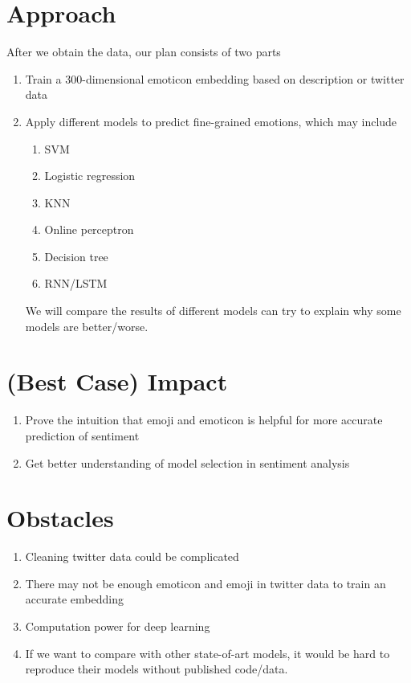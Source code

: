 \documentclass{proc}
\begin{document}
\section{Approach}
After we obtain the data, our plan consists of two parts
\begin{enumerate}
\item Train a 300-dimensional emoticon embedding based on description or twitter data
\item Apply different models to predict fine-grained emotions, which may include
\begin{enumerate}
  \item SVM
  \item Logistic regression
  \item KNN
  \item Online perceptron
  \item Decision tree
  \item RNN/LSTM 
  \end{enumerate}
  We will compare the results of different models can try to explain why some models are better/worse.
\end{enumerate}


\section{(Best Case) Impact}

\begin{enumerate}
\item Prove the intuition that emoji and emoticon is helpful for more accurate prediction of sentiment
 \item Get better understanding of model selection in sentiment analysis 
\end{enumerate}


\section{Obstacles}
\begin{enumerate}
  \item Cleaning twitter data could be complicated
  \item There may not be enough emoticon and emoji in twitter data to train an accurate embedding 
  \item Computation power for deep learning
  \item If we want to compare with other state-of-art models, it would be hard to reproduce their models without published code/data. 
  \end{enumerate}


\end{document}
